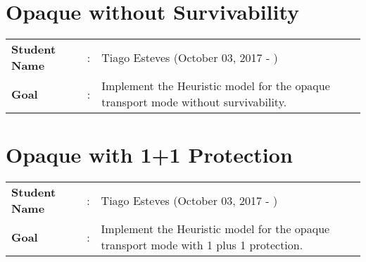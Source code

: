 \clearpage

\section{Opaque without Survivability}
\begin{tcolorbox}	
\begin{tabular}{p{2.75cm} p{0.2cm} p{10.5cm}} 	
\textbf{Student Name}  &:& Tiago Esteves    (October 03, 2017 - )\\
\textbf{Goal}          &:& Implement the Heuristic model for the opaque transport mode without survivability.
\end{tabular}
\end{tcolorbox}

\newpage
\section{Opaque with 1+1 Protection}
\begin{tcolorbox}	
\begin{tabular}{p{2.75cm} p{0.2cm} p{10.5cm}} 	
\textbf{Student Name}  &:& Tiago Esteves    (October 03, 2017 - )\\
\textbf{Goal}          &:& Implement the Heuristic model for the opaque transport mode with 1 plus 1 protection.
\end{tabular}
\end{tcolorbox}
